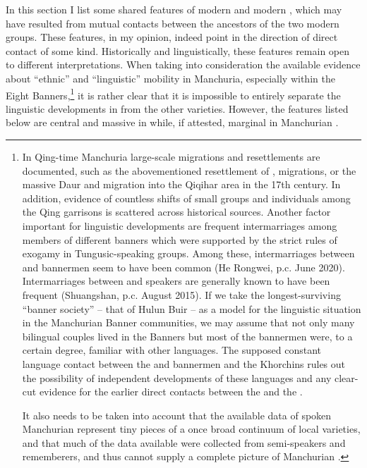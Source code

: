 \documentclass[output=paper,colorlinks,citecolor=brown]{langscibook}
\begin{document}
In this section I list some shared features of modern  and modern , which may have resulted from mutual contacts between the ancestors of the two modern groups. These features, in my opinion, indeed point in the direction of direct contact of some kind. Historically and linguistically, these features remain open to different interpretations. When taking into consideration the available evidence about “ethnic” and “linguistic” mobility in Manchuria, especially within the Eight Banners,\footnote{In Qing-time Manchuria large-scale migrations and resettlements are documented, such as the abovementioned resettlement of ,  migrations, or the massive Daur and  migration into the Qiqihar area in the 17th century. In addition, evidence of countless shifts of small groups and individuals among the Qing garrisons is scattered across historical sources. Another factor important for linguistic developments are frequent intermarriages among members of different banners which were supported by the strict rules of exogamy in Tungusic-speaking groups. Among these, intermarriages between  and  bannermen seem to have been common (He Rongwei, p.c. June 2020). Intermarriages between  and  speakers are generally known to have been frequent (Shuangshan, p.c. August 2015). If we take the longest-surviving “banner society” – that of Hulun Buir – as a model for the linguistic situation in the Manchurian Banner communities, we may assume that not only many bilingual couples lived in the Banners but most of the bannermen were, to a certain degree, familiar with other languages. The supposed constant language contact between the  and  bannermen and the Khorchins rules out the possibility of independent developments of these languages and any clear-cut evidence for the earlier direct contacts between the  and the .

It also needs to be taken into account that the available data of spoken Manchurian  represent tiny pieces of a once broad continuum of local varieties, and that much of the data available were collected from semi-speakers and rememberers, and thus cannot supply a complete picture of Manchurian .} it is rather clear that it is impossible to entirely separate the linguistic developments in  from the other  varieties. However, the features listed below are central and massive in  while, if attested, marginal in Manchurian .
\end{document}
